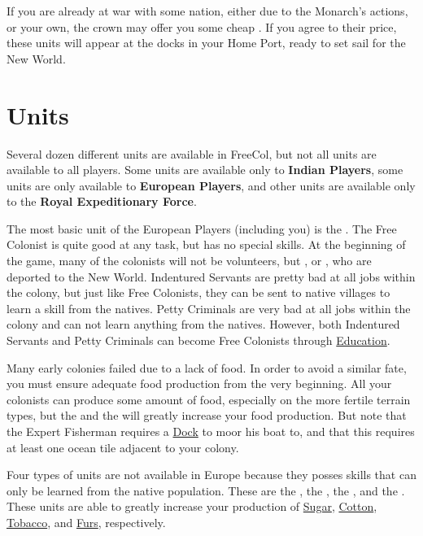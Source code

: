 \documentclass[12pt]{book}
\begin{document}
If you are already at war with some nation, either due to the
Monarch's actions, or your own, the crown may offer you some cheap
. If you agree to their price, these units will
appear at the docks in your Home Port, ready to set sail for the New
World.



\hypertarget{Units}{\chapter{Units}}

Several dozen different units are available in FreeCol, but not all
units are available to all players. Some units are available only to
\textbf{Indian Players}, some units are only available to
\textbf{European Players}, and other units are available only to the
\textbf{Royal Expeditionary Force}.

The most basic unit of the European Players (including you) is the
. The Free Colonist is quite good at any task, but
has no special skills. At the beginning of the game, many of the
colonists will not be volunteers, but , or
, who are deported to the New World. Indentured
Servants are pretty bad at all jobs within the colony, but just like
Free Colonists, they can be sent to native villages to learn a skill
from the natives. Petty Criminals are very bad at all jobs within the
colony and can not learn anything from the natives. However, both
Indentured Servants and Petty Criminals can become Free Colonists
through \hyperlink{Skills and Education}{Education}.

Many early colonies failed due to a lack of food. In order to avoid a
similar fate, you must ensure adequate food production from the very
beginning. All your colonists can produce some amount of food,
especially on the more fertile terrain types, but the  and the  will greatly increase your
food production. But note that the Expert Fisherman requires a
\hyperlink{Dock}{Dock} to moor his boat to, and that this requires at
least one ocean tile adjacent to your colony.

Four types of units are not available in Europe because they posses
skills that can only be learned from the native population. These are
the , the , the
, and the . These units are able to greatly increase your production of
\hyperlink{Sugar}{Sugar}, \hyperlink{Cotton}{Cotton},
\hyperlink{Tobacco}{Tobacco}, and \hyperlink{Furs}{Furs},
respectively.
\end{document}
